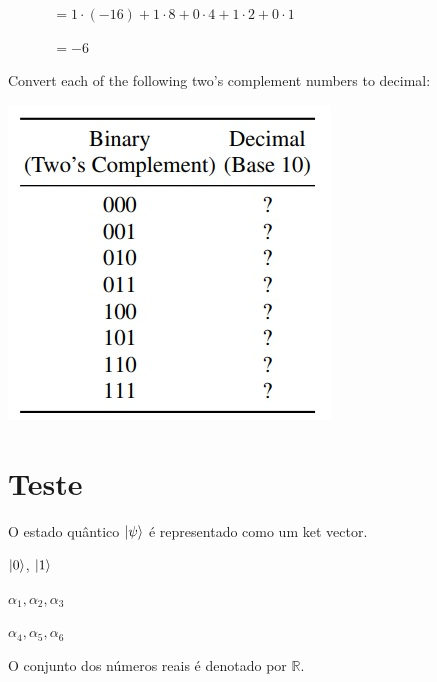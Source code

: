 \documentclass[12pt]{article}
\begin{document}
\(\quad\quad\quad\,= 1 \cdot (-16) + 1 \cdot 8 + 0 \cdot 4 + 1 \cdot 2 + 0 \cdot 1\)

\(\quad\quad\quad\,= - 6 \)

Convert each of the following two’s complement numbers to decimal:

\begin{center}
	\includegraphics[width=0.5\linewidth]{figuras/exe_1-8}
\end{center}




\newpage
\section{Teste}

O estado quântico $\ket{\psi}$ é representado como um ket vector.

$\ket{0}$, $\ket{1}$

$\alpha_{1}, \alpha_{2}, \alpha_{3}$

\(\alpha_{4}, \alpha_{5}, \alpha_{6} \)

O conjunto dos números reais é denotado por $\mathbb{R}$.



\newpage

	
\end{document}
